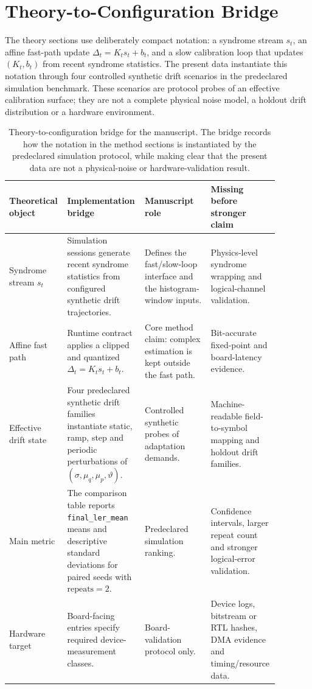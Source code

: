 \documentclass[11pt]{article}
\newcommand{\finalLER}{\texttt{final\_ler\_mean}}
\begin{document}
\section{Theory-to-Configuration Bridge}

The theory sections use deliberately compact notation: a syndrome stream
\(s_t\), an affine fast-path update \(\Delta_t=K_t s_t+b_t\), and a slow
calibration loop that updates \((K_t,b_t)\) from recent syndrome statistics.
The present data instantiate this notation through four controlled
synthetic drift scenarios in the predeclared simulation benchmark.  These
scenarios are protocol probes of an effective calibration surface; they are
not a complete physical noise model, a holdout drift distribution or a
hardware environment.

\begin{table}[htbp]
\centering
\small
\begin{tabular}{@{}>{\raggedright\arraybackslash}p{0.20\linewidth}>{\raggedright\arraybackslash}p{0.27\linewidth}>{\raggedright\arraybackslash}p{0.24\linewidth}>{\raggedright\arraybackslash}p{0.17\linewidth}@{}}
\toprule
Theoretical object & Implementation bridge & Manuscript role & Missing before stronger claim \\
\midrule
Syndrome stream \(s_t\) &
Simulation sessions generate recent syndrome statistics from configured
synthetic drift trajectories. &
Defines the fast/slow-loop interface and the histogram-window inputs. &
Physics-level syndrome wrapping and logical-channel validation. \\
\addlinespace
Affine fast path &
Runtime contract applies a clipped and quantized
\(\Delta_t=K_t s_t+b_t\). &
Core method claim: complex estimation is kept outside the fast path. &
Bit-accurate fixed-point and board-latency evidence. \\
\addlinespace
Effective drift state &
Four predeclared synthetic drift families instantiate static, ramp, step
and periodic perturbations of \((\sigma,\mu_q,\mu_p,\vartheta)\). &
Controlled synthetic probes of adaptation demands. &
Machine-readable field-to-symbol mapping and holdout drift families. \\
\addlinespace
Main metric &
The comparison table reports \finalLER{} means and descriptive standard
deviations for paired seeds with \(\mathrm{repeats}=2\). &
Predeclared simulation ranking. &
Confidence intervals, larger repeat count and stronger logical-error validation. \\
\addlinespace
Hardware target &
Board-facing entries specify required device-measurement classes. &
Board-validation protocol only. &
Device logs, bitstream or RTL hashes, DMA evidence and timing/resource data. \\
\bottomrule
\end{tabular}
\caption{Theory-to-configuration bridge for the manuscript.
The bridge records how the notation in the method sections is instantiated by
the predeclared simulation protocol, while making clear that the present data
are not a physical-noise or hardware-validation result.}
\label{tab:theory-config-bridge}
\end{table}
\end{document}
